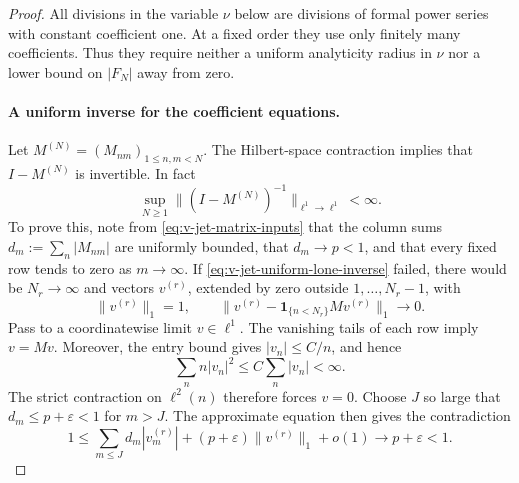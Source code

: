 \begin{proof}
All divisions in the variable $\nu$ below are divisions of formal power
series with constant coefficient one.  At a fixed order they use only
finitely many coefficients.  Thus they require neither a uniform
analyticity radius in $\nu$ nor a lower bound on $|F_N|$ away from zero.

\paragraph{A uniform inverse for the coefficient equations.}
Let $M^{(N)}=(M_{nm})_{1\le n,m<N}$.  The Hilbert-space contraction
implies that $I-M^{(N)}$ is invertible.  In fact
\begin{equation}\label{eq:v-jet-uniform-lone-inverse}
 \sup_{N\ge1}\|(I-M^{(N)})^{-1}\|_{\ell^1\to\ell^1}<\infty.
\end{equation}
To prove this, note from \eqref{eq:v-jet-matrix-inputs} that the column
sums $d_m:=\sum_n|M_{nm}|$ are uniformly bounded, that $d_m\to p<1$,
and that every fixed row tends to zero as $m\to\infty$.  If
\eqref{eq:v-jet-uniform-lone-inverse} failed, there would be
$N_r\to\infty$ and vectors $v^{(r)}$, extended by zero outside
$1,\ldots,N_r-1$, with
\[
 \|v^{(r)}\|_1=1,\qquad
 \|v^{(r)}-\mathbf1_{\{n<N_r\}}Mv^{(r)}\|_1\longrightarrow0.
\]
Pass to a coordinatewise limit $v\in\ell^1$.  The vanishing tails of
each row imply $v=Mv$.  Moreover, the entry bound gives
$|v_n|\le C/n$, and hence
\[
 \sum_n n|v_n|^2\le C\sum_n|v_n|<\infty.
\]
The strict contraction on $\ell^2(n)$ therefore forces $v=0$.
Choose $J$ so large that $d_m\le p+\varepsilon<1$ for $m>J$.
The approximate equation then gives the contradiction
\[
 1\le\sum_{m\le J}d_m|v_m^{(r)}|
       +(p+\varepsilon)\|v^{(r)}\|_1+o(1)
   \longrightarrow p+\varepsilon<1.
\]


\end{proof}
